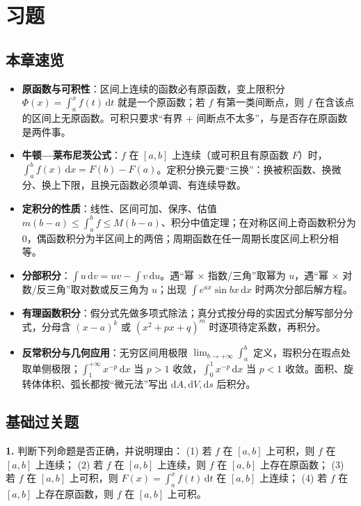 \section{习题}
\subsection{本章速览}
\begin{itemize}
  \item \textbf{原函数与可积性}：区间上连续的函数必有原函数，变上限积分 $\Phi(x)=\int_a^x f(t)\,\mathrm dt$ 就是一个原函数；若 $f$ 有第一类间断点，则 $f$ 在含该点的区间上无原函数。可积只要求“有界 + 间断点不太多”，与是否存在原函数是两件事。
  \item \textbf{牛顿—莱布尼茨公式}：$f$ 在 $[a,b]$ 上连续（或可积且有原函数 $F$）时，$\int_a^b f(x)\,\mathrm dx=F(b)-F(a)$。定积分换元要“三换”：换被积函数、换微分、换上下限，且换元函数必须单调、有连续导数。
  \item \textbf{定积分的性质}：线性、区间可加、保序、估值 $m(b-a)\le\int_a^b f\le M(b-a)$、积分中值定理；在对称区间上奇函数积分为 $0$，偶函数积分为半区间上的两倍；周期函数在任一周期长度区间上积分相等。
  \item \textbf{分部积分}：$\int u\,\mathrm dv=uv-\int v\,\mathrm du$。遇“幂 $\times$ 指数/三角”取幂为 $u$，遇“幂 $\times$ 对数/反三角”取对数或反三角为 $u$；出现 $\int e^{ax}\sin bx\,\mathrm dx$ 时两次分部后解方程。
  \item \textbf{有理函数积分}：假分式先做多项式除法；真分式按分母的实因式分解写部分分式，分母含 $(x-a)^k$ 或 $(x^2+px+q)^m$ 时逐项待定系数，再积分。
  \item \textbf{反常积分与几何应用}：无穷区间用极限 $\lim_{b\to+\infty}\int_a^b$ 定义，瑕积分在瑕点处取单侧极限；$\int_1^{+\infty}x^{-p}\,\mathrm dx$ 当 $p>1$ 收敛，$\int_0^1 x^{-p}\,\mathrm dx$ 当 $p<1$ 收敛。面积、旋转体体积、弧长都按“微元法”写出 $\mathrm dA,\mathrm dV,\mathrm ds$ 后积分。
\end{itemize}

\subsection{基础过关题}

\textbf{1.} 判断下列命题是否正确，并说明理由：
(1) 若 $f$ 在 $[a,b]$ 上可积，则 $f$ 在 $[a,b]$ 上连续；
(2) 若 $f$ 在 $[a,b]$ 上连续，则 $f$ 在 $[a,b]$ 上存在原函数；
(3) 若 $f$ 在 $[a,b]$ 上可积，则 $F(x)=\int_a^x f(t)\,\mathrm dt$ 在 $[a,b]$ 上连续；
(4) 若 $f$ 在 $[a,b]$ 上存在原函数，则 $f$ 在 $[a,b]$ 上可积。

